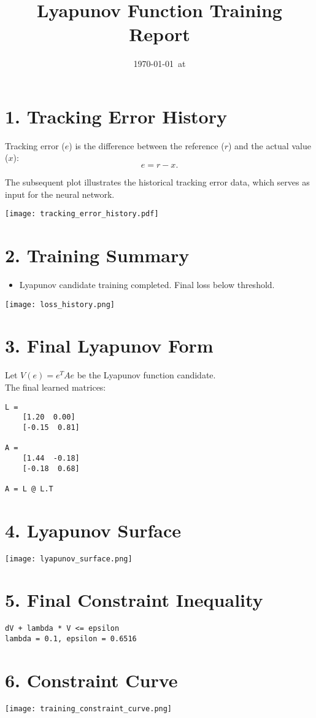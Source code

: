 \documentclass[11pt]{article}
\title{Lyapunov Function Training Report}
\author{}
\date{\today\ at \currenttime}
\begin{document}
\maketitle
\thispagestyle{fancy}

\section*{1. Tracking Error History}
Tracking error ($e$) is the difference between the reference ($r$) and the actual value ($x$):
\begin{equation}
e = r - x.
\end{equation}

\indent The subsequent plot illustrates the historical tracking error data, which serves as input for the neural network.

\texttt{[image: tracking\_error\_history.pdf]}

\section*{2. Training Summary}
\begin{itemize}
  \item Lyapunov candidate training completed. Final loss below threshold.
\end{itemize}
\texttt{[image: loss\_history.png]}

\section*{3. Final Lyapunov Form}
Let $V(e) = e^T A e$ be the Lyapunov function candidate. \\
The final learned matrices:
\begin{verbatim}
L = 
    [1.20  0.00]
    [-0.15  0.81]

A = 
    [1.44  -0.18]
    [-0.18  0.68]

A = L @ L.T
\end{verbatim}

\section*{4. Lyapunov Surface}
\texttt{[image: lyapunov\_surface.png]}

\section*{5. Final Constraint Inequality}
\begin{verbatim}
dV + lambda * V <= epsilon
lambda = 0.1, epsilon = 0.6516\end{verbatim}

\section*{6. Constraint Curve}
\texttt{[image: training\_constraint\_curve.png]}
\end{document}
